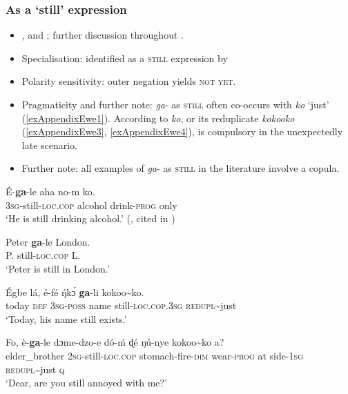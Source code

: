 \subsubsection{As a  \lq still\rq{ }expression}\label{appendixEweStill}
\begin{itemize}
	\item \textcite{Ameka2008}, \textcite[468]{Rongier2015} and \textcite[152]{Westermann1905}; further discussion throughout \textcite{vanBaar1997}.
		\item Specialisation: identified as a \textsc{still} expression by \textcite{vanBaar1997}
\item Polarity sensitivity: outer negation yields \textsc{not yet}.
\item Pragmaticity and further note: \textit{ga}- as \textsc{still} often co-occurs with \textit{ko} \lq just' (\ref{exAppendixEwe1}). According to \textcite[76]{vanBaar1997} \textit{ko}, or its reduplicate \textit{kokooko} (\ref{exAppendixEwe3}, \ref{exAppendixEwe4}), is compulsory in the unexpectedly late scenario.
\item Further note: all examples of \mbox{\textit{ga}-} as \textsc{still} in the literature involve a copula.
\end{itemize}
\begin{exe}
	\ex\label{exAppendixEwe1}
	\gll É-\textbf{ga}-le aha no-m ko.\\
	3\textsc{sg}-still-\textsc{loc}.\textsc{cop} alcohol drink-\textsc{prog} only\\
	\glt \lq He is still drinking alcohol.' (\cite{Ameka2018}, cited in \cite[8]{Kramer2021b})

	\ex\label{exAppendixEwe2}
	\gll Peter \textbf{ga}-le London.\\
	P. still-\textsc{loc}.\textsc{cop} L.\\
	\glt \lq Peter is still in London.' \parencite[24]{vanBaar1997}

	\ex\label{exAppendixEwe3}
	\gll Égbe lá, é-fé ŋ́kɔ́ \textbf{ga}-li kokoo\sim{}ko.\\
	today \textsc{def} 3\textsc{sg}-\textsc{poss} name still-\textsc{loc}.\textsc{cop}.3\textsc{sg} \textsc{redupl}\sim{}just\\
	\glt \lq Today, his name still exists.' \parencite[142]{Ameka2008}

	\ex\label{exAppendixEwe4}
	\gll Fo, è-\textbf{ga}-le dɔme-dzo-e dó-ḿ ɖé ŋú-nye kokoo\sim{}ko a?\\
	elder\_brother 2\textsc{sg}-still-\textsc{loc}.\textsc{cop} stomach-fire-\textsc{dim} wear-\textsc{prog} at side-1\textsc{sg} \textsc{redupl}\sim{}just \textsc{q}\\
	\glt \lq Dear, are you still annoyed with me?' \parencite[582]{Ameka1991}
\end{exe}

